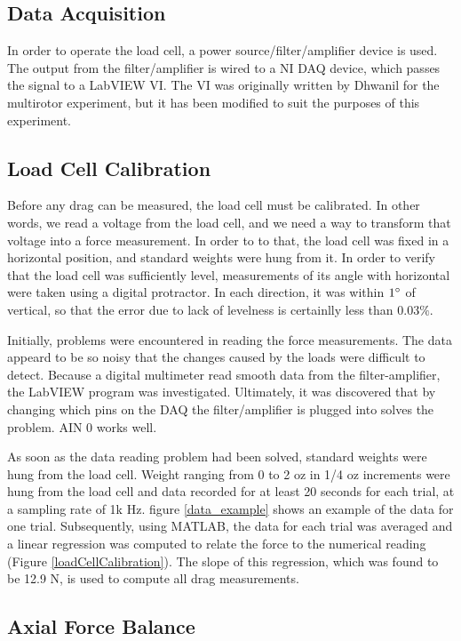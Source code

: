 \documentclass[12pt]{report} %
\begin{document}
\subsection{Data Acquisition}
In order to operate the load cell, a power source/filter/amplifier device is used. The output from the filter/amplifier is wired to
a NI DAQ device, which passes the signal to a LabVIEW VI. The VI was originally written by Dhwanil for the multirotor experiment,
but it has been modified to suit the purposes of this experiment.

\subsection{Load Cell Calibration}
Before any drag can be measured, the load cell must be calibrated. In other words, we read a voltage from the load cell, and we need a way to
transform that voltage into a force measurement. In order to to that, the load cell was fixed in a horizontal position, and standard weights
were hung from it. In order to verify that the load cell was sufficiently level, measurements of its angle with horizontal were taken using a
digital protractor. In each direction, it was within $1\degree$ of vertical, so that the error due to lack of levelness is certainlly less
than $0.03\%$.

Initially, problems were encountered in reading the force measurements. The data appeard to be so noisy that the changes caused by
the loads were difficult to detect. Because a digital multimeter read smooth data from the filter-amplifier, the LabVIEW program was
investigated. Ultimately, it was discovered that by changing which pins on the DAQ the filter/amplifier is plugged into solves the
problem. AIN 0 works well.

As soon as the data reading problem had been solved, standard weights were hung from the load cell. Weight ranging from 0 to 2 oz in
1/4 oz increments were hung from the load cell and data recorded for at least 20 seconds for each trial, at a sampling rate of 1k Hz.
figure \ref{data_example} shows an example of the data for one trial. Subsequently, using MATLAB, the data for each trial was averaged
and a linear regression was computed to relate the force to the numerical reading (Figure \ref{loadCellCalibration}). The slope
of this regression, which was found to be 12.9 N, is used to compute all drag measurements.

\subsection{Axial Force Balance}
\end{document}

